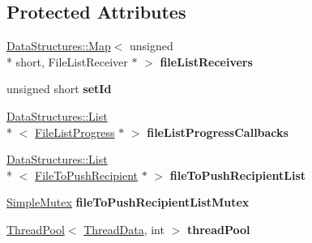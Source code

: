 \subsection*{Protected Attributes}
\begin{DoxyCompactItemize}
\item 
\hypertarget{class_rak_net_1_1_file_list_transfer_a459175c83bbad182e0517b6bcec4d92e}{\hyperlink{class_data_structures_1_1_map}{Data\-Structures\-::\-Map}$<$ unsigned \\*
short, File\-List\-Receiver $\ast$ $>$ {\bfseries file\-List\-Receivers}}\label{class_rak_net_1_1_file_list_transfer_a459175c83bbad182e0517b6bcec4d92e}

\item 
\hypertarget{class_rak_net_1_1_file_list_transfer_abc95ac31785001a1b4f4633328f1b399}{unsigned short {\bfseries set\-Id}}\label{class_rak_net_1_1_file_list_transfer_abc95ac31785001a1b4f4633328f1b399}

\item 
\hypertarget{class_rak_net_1_1_file_list_transfer_af590a86fad89b8ba183865da10d1f317}{\hyperlink{class_data_structures_1_1_list}{Data\-Structures\-::\-List}\\*
$<$ \hyperlink{class_rak_net_1_1_file_list_progress}{File\-List\-Progress} $\ast$ $>$ {\bfseries file\-List\-Progress\-Callbacks}}\label{class_rak_net_1_1_file_list_transfer_af590a86fad89b8ba183865da10d1f317}

\item 
\hypertarget{class_rak_net_1_1_file_list_transfer_ae940684105a4ecd0d29bf024b4a9f820}{\hyperlink{class_data_structures_1_1_list}{Data\-Structures\-::\-List}\\*
$<$ \hyperlink{struct_rak_net_1_1_file_list_transfer_1_1_file_to_push_recipient}{File\-To\-Push\-Recipient} $\ast$ $>$ {\bfseries file\-To\-Push\-Recipient\-List}}\label{class_rak_net_1_1_file_list_transfer_ae940684105a4ecd0d29bf024b4a9f820}

\item 
\hypertarget{class_rak_net_1_1_file_list_transfer_a836f33e2b5d479548dc50084f5e7c7da}{\hyperlink{class_rak_net_1_1_simple_mutex}{Simple\-Mutex} {\bfseries file\-To\-Push\-Recipient\-List\-Mutex}}\label{class_rak_net_1_1_file_list_transfer_a836f33e2b5d479548dc50084f5e7c7da}

\item 
\hypertarget{class_rak_net_1_1_file_list_transfer_a7cad27e275569a21a016df29cb03c77b}{\hyperlink{struct_thread_pool}{Thread\-Pool}$<$ \hyperlink{struct_rak_net_1_1_file_list_transfer_1_1_thread_data}{Thread\-Data}, int $>$ {\bfseries thread\-Pool}}\label{class_rak_net_1_1_file_list_transfer_a7cad27e275569a21a016df29cb03c77b}

\end{DoxyCompactItemize}

